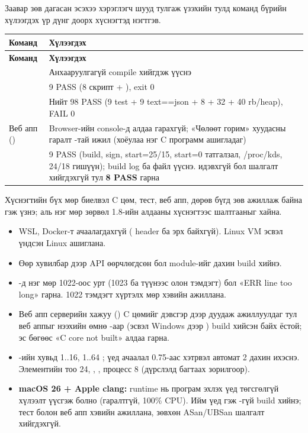 Заавар зөв дагасан эсэхээ хэрэглэгч шууд тулгаж үзэхийн тулд команд бүрийн хүлээгдэх үр дүнг доорх хүснэгтэд нэгтгэв.
\begin{longtable}{@{}L{58mm}L{98mm}@{}}
\textbf{Команд} & \textbf{Хүлээгдэх}\\
\endfirsthead
\textbf{Команд} & \textbf{Хүлээгдэх}\\
\endhead
{} & Анхааруулгагүй compile хийгдэж  үүснэ\\
 & 9 PASS (8 скрипт + ), exit 0\\
 & Нийт 98 PASS (9 test + 9 text==json + 8  + 32  + 40 rb/heap), FAIL 0\\
Веб апп () & Browser-ийн console-д алдаа гарахгүй; «Чөлөөт горим» хуудасны гаралт -тай ижил (хоёулаа нэг C программ ашигладаг)\\
 & 9 PASS (build, sign,  start=25/15, start=0 татгалзал, /proc/kds,  24/18 гишүүн); build log ба  файл үүснэ.  идэвхгүй бол  шалгалт хийгдэхгүй тул \textbf{8 PASS} гарна\\
\end{longtable}
Хүснэгтийн бүх мөр биелвэл C цөм, тест, веб апп,  дөрөв бүгд зөв ажиллаж байна гэж үзнэ; аль нэг мөр зөрвөл 1.8-ийн алдааны хүснэгтээс шалтгааныг хайна.

\begin{itemize}[leftmargin=20pt,itemsep=1pt,topsep=2pt]
  \item {} WSL, Docker-т ачаалагдахгүй ( header ба  эрх байхгүй). Linux VM эсвэл үндсэн Linux ашиглана.
  \item Өөр  хувилбар дээр API өөрчлөгдсөн бол module-ийг дахин build хийнэ.
  \item {}-д нэг мөр 1022-оос урт (1023 ба түүнээс олон тэмдэгт) бол «ERR line too long» гарна. 1022 тэмдэгт хүртэлх мөр хэвийн ажиллана.
  \item Веб апп серверийн хажуу () C цөмийг дэвсгэр дээр дуудаж ажиллуулдаг тул веб аппыг нээхийн өмнө -аар  (эсвэл Windows дээр ) build хийсэн байх ёстой; эс бөгөөс «C core not built» алдаа гарна.
  \item {}-ийн хувьд  1..16,  1..64 ;  үед ачаалал 0.75-аас хэтрвэл  автомат 2 дахин ихэснэ. Элементийн тоо 24, , , процесс 8 (дүрслэлд багтаах зорилгоор).
  \item \textbf{macOS 26 + Apple clang:}  runtime нь програм эхлэх үед төгсгөлгүй хүлээлт үүсгэж болно (гаралтгүй, 100\% CPU). Ийм үед  гэж -гүй build хийнэ; тест болон веб апп хэвийн ажиллана, зөвхөн ASan/UBSan шалгалт хийгдэхгүй.
\end{itemize}


